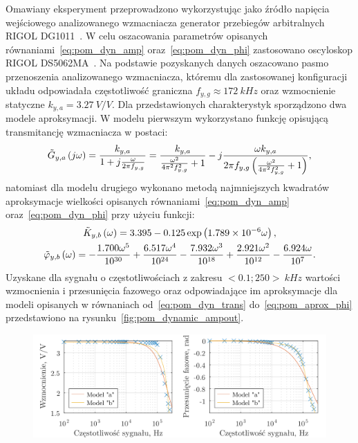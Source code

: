 Omawiany eksperyment przeprowadzono wykorzystując jako źródło napięcia wejściowego analizowanego wzmacniacza generator przebiegów arbitralnych RIGOL DG1011~\cite{rigol_fawg}. W celu oszacowania parametrów opisanych równaniami~\eqref{eq:pom_dyn_amp} oraz~\eqref{eq:pom_dyn_phi} zastosowano oscyloskop RIGOL DS5062MA~\cite{rigol_dso}. Na podstawie pozyskanych danych oszacowano pasmo przenoszenia analizowanego wzmacniacza, któremu dla zastosowanej konfiguracji układu odpowiadała częstotliwość graniczna $f_{y,g} \approx \qty{172}{kHz}$ oraz wzmocnienie statyczne $k_{y,a} = \qty{3.27}{V \per V}$. Dla przedstawionych charakterystyk sporządzono dwa modele aproksymacji. W modelu pierwszym wykorzystano funkcję opisującą transmitancję wzmacniacza w postaci:
\begin{gather}
\tilde{G}_{y,a} \left(j\omega\right) = \frac{k_{y,a}}{1 + j \frac{\omega}{2 \pi f_{y,g}}} = \frac{k_{y,a}}{\frac{\omega^{2}}{4 \pi^{2} f_{y,g}^{2}} + 1} - j \frac{\omega k_{y,a}}{2 \pi f_{y,g} \left( \frac{\omega^{2}}{4 \pi^{2} f_{y,g}^{2}} + 1 \right) } \label{eq:pom_dyn_trans},
\end{gather}
natomiast dla modelu drugiego wykonano metodą najmniejszych kwadratów aproksymacje wielkości opisanych równaniami~\eqref{eq:pom_dyn_amp} oraz~\eqref{eq:pom_dyn_phi} przy użyciu funkcji:
\begin{gather}
\tilde{K}_{y,b} \left(\omega\right) = 3.395 - 0.125 \exp \left(\num{1.789e-6} \omega\right) \label{eq:pom_aprox_amp}, \\
\tilde{\varphi}_{y,b} \left(\omega\right) = -\frac{1.700 \omega^{5}}{\num{e30}} + \frac{6.517 \omega^{4}}{\num{e24}} - \frac{7.932 \omega^{3}}{\num{e18}} + \frac{2.921 \omega^{2}}{\num{e12}} - \frac{6.924 \omega}{\num{e07}} \label{eq:pom_aprox_phi}.
\end{gather}
Uzyskane dla sygnału o częstotliwościach z zakresu $<0.1; 250>~\unit{kHz}$ wartości wzmocnienia i przesunięcia fazowego oraz odpowiadające im aproksymacje dla modeli opisanych w równaniach od~\eqref{eq:pom_dyn_trans} do~\eqref{eq:pom_aprox_phi} przedstawiono na rysunku~\ref{fig:pom_dynamic_ampout}.

\begin{figure}[htb!]
\begin{center}
\includegraphics{obrazki/dynamic_ampout}
\end{center}
\end{figure}

